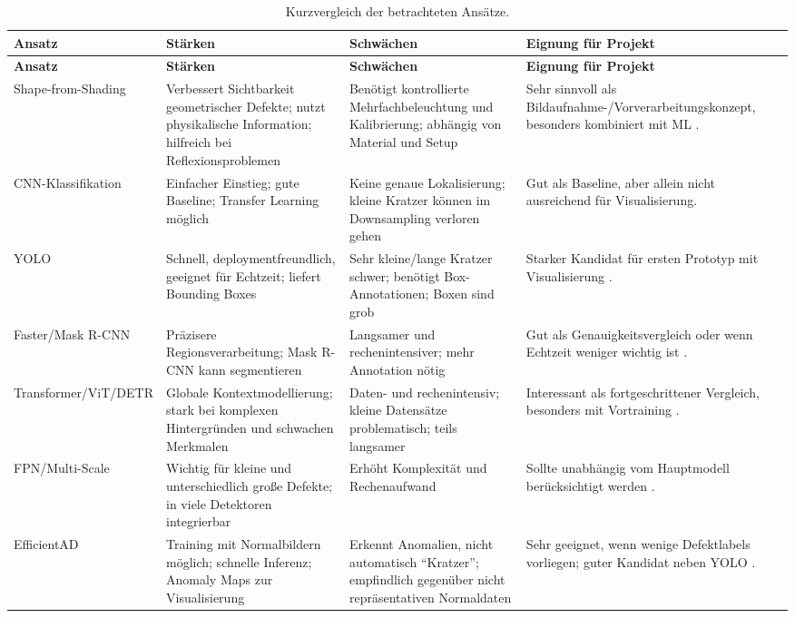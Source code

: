\documentclass[11pt,a4paper]{article}
\begin{document}
\begin{longtable}{p{}p{}p{}p{}}
\caption{Kurzvergleich der betrachteten Ansätze.}\\
\toprule
\textbf{Ansatz} & \textbf{Stärken} & \textbf{Schwächen} & \textbf{Eignung für Projekt}\\
\midrule
\endfirsthead
\toprule
\textbf{Ansatz} & \textbf{Stärken} & \textbf{Schwächen} & \textbf{Eignung für Projekt}\\
\midrule
\endhead
Shape-from-Shading & Verbessert Sichtbarkeit geometrischer Defekte; nutzt physikalische Information; hilfreich bei Reflexionsproblemen & Benötigt kontrollierte Mehrfachbeleuchtung und Kalibrierung; abhängig von Material und Setup & Sehr sinnvoll als Bildaufnahme-/Vorverarbeitungskonzept, besonders kombiniert mit ML \cite{ersteinfos}.\\
CNN-Klassifikation & Einfacher Einstieg; gute Baseline; Transfer Learning möglich & Keine genaue Lokalisierung; kleine Kratzer können im Downsampling verloren gehen & Gut als Baseline, aber allein nicht ausreichend für Visualisierung.\\
YOLO & Schnell, deploymentfreundlich, geeignet für Echtzeit; liefert Bounding Boxes & Sehr kleine/lange Kratzer schwer; benötigt Box-Annotationen; Boxen sind grob & Starker Kandidat für ersten Prototyp mit Visualisierung \cite{applications_review}.\\
Faster/Mask R-CNN & Präzisere Regionsverarbeitung; Mask R-CNN kann segmentieren & Langsamer und rechenintensiver; mehr Annotation nötig & Gut als Genauigkeitsvergleich oder wenn Echtzeit weniger wichtig ist \cite{applications_review}.\\
Transformer/ViT/DETR & Globale Kontextmodellierung; stark bei komplexen Hintergründen und schwachen Merkmalen & Daten- und rechenintensiv; kleine Datensätze problematisch; teils langsamer & Interessant als fortgeschrittener Vergleich, besonders mit Vortraining \cite{vit_thesis,applications_review}.\\
FPN/Multi-Scale & Wichtig für kleine und unterschiedlich große Defekte; in viele Detektoren integrierbar & Erhöht Komplexität und Rechenaufwand & Sollte unabhängig vom Hauptmodell berücksichtigt werden \cite{applications_review}.\\
EfficientAD & Training mit Normalbildern möglich; schnelle Inferenz; Anomaly Maps zur Visualisierung & Erkennt Anomalien, nicht automatisch \enquote{Kratzer}; empfindlich gegenüber nicht repräsentativen Normaldaten & Sehr geeignet, wenn wenige Defektlabels vorliegen; guter Kandidat neben YOLO \cite{efficientad}.\\
\bottomrule
\end{longtable}
\end{document}

